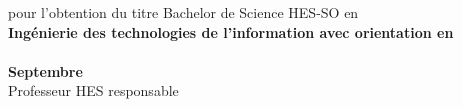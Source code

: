 \begin{titlepage}
\begin{center}
{{				%
				{\large pour l’obtention du titre Bachelor de Science HES-SO en\\[10pt]
				
				 \fontsize{14pt}{20pt} \textbf{Ingénierie des technologies de l’information avec orientation en\\ \Orientation }\\[32pt]
				
				\textbf{Septembre \Year}}\\[49pt]
				
				Professeur HES responsable\\[13pt]
				\textbf{ \Professor }\\
			}
			\vfill
		}%
	\end{center}
\end{titlepage}
\addtocounter{page}{1}
